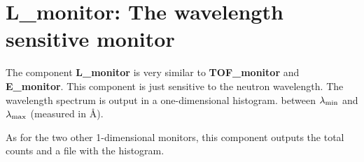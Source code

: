 

\section{L\_monitor: The wavelength sensitive monitor}
\label{s:L_monitor}


The component {\bf L\_monitor} is very similar to
{\bf TOF\_monitor} and {\bf E\_monitor}.
This component is just sensitive to the neutron wavelength.
The wavelength spectrum is output in a one-dimensional histogram.
between $\lambda_{\rm min}$ and $\lambda_{\rm max}$ (measured in \AA ).

As for the two other 1-dimensional monitors, this component outputs
the total counts and a file with the histogram.

